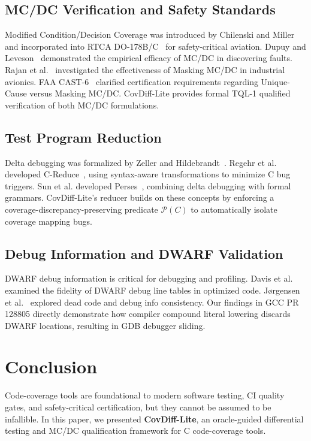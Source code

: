 \documentclass[sigconf,review,anonymous=false]{acmart}
\theoremstyle{definition}
\begin{document}
\subsection{MC/DC Verification and Safety Standards}
Modified Condition/Decision Coverage was introduced by Chilenski and Miller~\cite{chilenski1994applicability} and incorporated into RTCA DO-178B/C~\cite{rtca2011do178c} for safety-critical aviation. Dupuy and Leveson~\cite{dupuy2000empirical} demonstrated the empirical efficacy of MC/DC in discovering faults. Rajan et al.~\cite{rajan2008requirements} investigated the effectiveness of Masking MC/DC in industrial avionics. FAA CAST-6~\cite{cast6} clarified certification requirements regarding Unique-Cause versus Masking MC/DC. CovDiff-Lite provides formal TQL-1 qualified verification of both MC/DC formulations.

\subsection{Test Program Reduction}
Delta debugging was formalized by Zeller and Hildebrandt~\cite{zeller2002simplifying}. Regehr et al. developed C-Reduce~\cite{regehr2012test}, using syntax-aware transformations to minimize C bug triggers. Sun et al. developed Perses~\cite{sun2018perses}, combining delta debugging with formal grammars. CovDiff-Lite's reducer builds on these concepts by enforcing a coverage-discrepancy-preserving predicate $\mathcal{P}(C)$ to automatically isolate coverage mapping bugs.

\subsection{Debug Information and DWARF Validation}
DWARF debug information is critical for debugging and profiling. Davis et al.~\cite{davis2019measuring} examined the fidelity of DWARF debug line tables in optimized code. J\o{}rgensen et al.~\cite{jorgensen2020dead} explored dead code and debug info consistency. Our findings in GCC PR 128805 directly demonstrate how compiler compound literal lowering discards DWARF locations, resulting in GDB debugger sliding.

\section{Conclusion}

Code-coverage tools are foundational to modern software testing, CI quality gates, and safety-critical certification, but they cannot be assumed to be infallible. In this paper, we presented \textbf{CovDiff-Lite}, an oracle-guided differential testing and MC/DC qualification framework for C code-coverage tools. 
\end{document}
